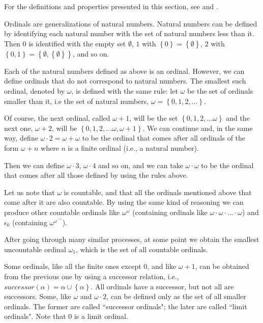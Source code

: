\documentclass[a4paper
,draft
]{article}
\newcommand{\multime}[1]{\left\{ #1 \right\}}
\newcommand{\ghilimele}[1]{``#1"}
\begin{document}
For the definitions and properties presented in this section,
see \textcite{sep-set-theory} and \textcite{Cohen1966}.

Ordinals are generalizations of natural numbers. Natural numbers can be
defined by identifying each natural number with the set of natural numbers less
than it. Then $0$ is identified with the empty set $\emptyset$,
$1$ with $\multime{0}=\multime{\emptyset}$,
$2$ with $\multime{0, 1}=\multime{\emptyset, \multime{\emptyset}}$,
and so on.

Each of the natural numbers defined as above is an ordinal.
However, we can define ordinals that do not correspond to natural numbers.
The smallest such ordinal, denoted by $\omega$, is defined with the same rule:
let $\omega$ be the set of ordinals smaller than it, i.e
the set of natural numbers, $\omega=\multime{0, 1, 2, \dots}$.

Of course, the next ordinal, called $\omega + 1$, will be the set
$\multime{0, 1, 2, \dots \omega}$ and the next one,
$\omega+2$, will be $\multime{0, 1, 2, \dots \omega, \omega+1}$. We can
continue and, in the same way, define $\omega\cdot 2=\omega+\omega$ to be
the ordinal that comes after all ordinals of the form $\omega+n$
where $n$ is a finite ordinal (i.e., a natural number).

Then we can define $\omega\cdot 3$, $\omega\cdot 4$ and so on, and we can
take $\omega\cdot \omega$ to be the ordinal that comes after all those
defined by using the rules above.

Let us note that $\omega$ is countable, and that all the ordinals mentioned
above that come after it are also countable.
By using the same kind of
reasoning we can produce other countable ordinals like
$\omega^\omega$ (containing ordinals like $\omega\cdot\omega\cdot\dots\cdot\omega$)
and $\epsilon_0$ (containing $\omega^{\omega^{\cdots^\omega}}$).

After going through many similar processes, at some point we obtain the
smallest uncountable ordinal $\omega_1$, which is the set of all
countable ordinals.

Some ordinals, like all the finite ones except $0$,
and like $\omega+1$, can be obtained from the previous one by using
a successor relation, i.e., $successor(\alpha) = \alpha\cup\multime{\alpha}$.
All ordinals have a successor, but not all are successors. Some, like
$\omega$ and $\omega\cdot 2$, can be defined only as the set of all
smaller ordinals. The former are called \ghilimele{successor ordinals};
the later are called \ghilimele{limit ordinals}. Note that $0$ is a limit
ordinal.
\end{document}
